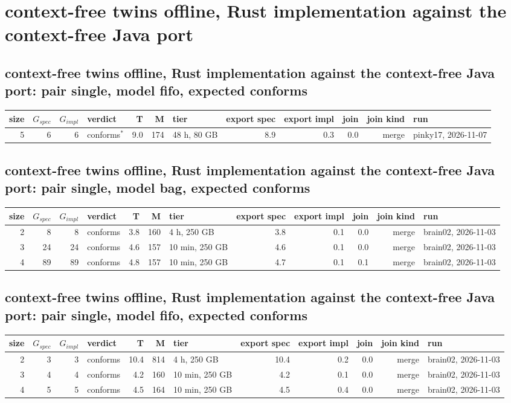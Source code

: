\documentclass[10pt]{article}
\begin{document}
\section*{context-free twins offline, Rust implementation against the context-free Java port}
\subsection*{context-free twins offline, Rust implementation against the context-free Java port: pair \textsf{single}, model fifo, expected conforms}
\begin{longtable}{@{}rrrlrrlrrrrl@{}}
\toprule
size & $G_{\mathit{spec}}$ & $G_{\mathit{impl}}$ & verdict & T & M & tier & export spec & export impl & join & join kind & run \\
\midrule
\endhead
\color{red} 5 & 6 & 6 & conforms$^{\ast}$ & 9.0 & 174 & 48 h, 80 GB & 8.9 & 0.3 & 0.0 & merge & pinky17, 2026-11-07 \\
\bottomrule
\end{longtable}
\subsection*{context-free twins offline, Rust implementation against the context-free Java port: pair \textsf{single}, model bag, expected conforms}
\begin{longtable}{@{}rrrlrrlrrrrl@{}}
\toprule
size & $G_{\mathit{spec}}$ & $G_{\mathit{impl}}$ & verdict & T & M & tier & export spec & export impl & join & join kind & run \\
\midrule
\endhead
\color{blue} 2 & 8 & 8 & conforms & 3.8 & 160 & 4 h, 250 GB & 3.8 & 0.1 & 0.0 & merge & brain02, 2026-11-03 \\
\color{blue} 3 & 24 & 24 & conforms & 4.6 & 157 & 10 min, 250 GB & 4.6 & 0.1 & 0.0 & merge & brain02, 2026-11-03 \\
\color{blue} 4 & 89 & 89 & conforms & 4.8 & 157 & 10 min, 250 GB & 4.7 & 0.1 & 0.1 & merge & brain02, 2026-11-03 \\
\bottomrule
\end{longtable}
\subsection*{context-free twins offline, Rust implementation against the context-free Java port: pair \textsf{single}, model fifo, expected conforms}
\begin{longtable}{@{}rrrlrrlrrrrl@{}}
\toprule
size & $G_{\mathit{spec}}$ & $G_{\mathit{impl}}$ & verdict & T & M & tier & export spec & export impl & join & join kind & run \\
\midrule
\endhead
\color{blue} 2 & 3 & 3 & conforms & 10.4 & 814 & 4 h, 250 GB & 10.4 & 0.2 & 0.0 & merge & brain02, 2026-11-03 \\
\color{blue} 3 & 4 & 4 & conforms & 4.2 & 160 & 10 min, 250 GB & 4.2 & 0.1 & 0.0 & merge & brain02, 2026-11-03 \\
\color{blue} 4 & 5 & 5 & conforms & 4.5 & 164 & 10 min, 250 GB & 4.5 & 0.4 & 0.0 & merge & brain02, 2026-11-03 \\
\bottomrule
\end{longtable}
\end{document}
